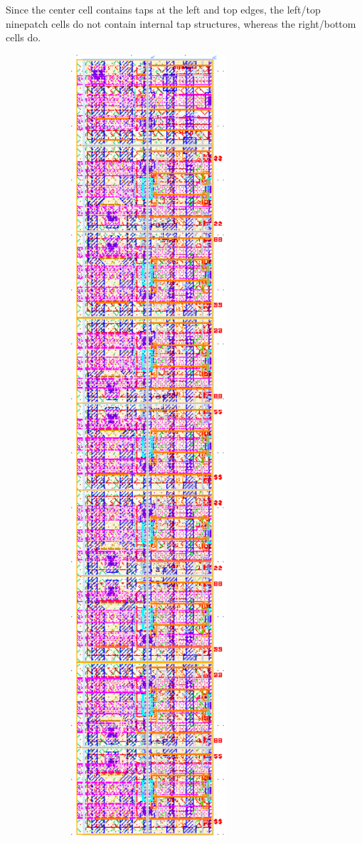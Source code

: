 Since the center cell contains taps at the left and top edges, the left/top ninepatch cells
do not contain internal tap structures, whereas the right/bottom cells do.
\begin{figure}[H] \centering
\begin{subfigure}[b]{0.22\textwidth} \centering
\includegraphics[width=0.7\textwidth]{figures/bitcell_left.png}

\end{subfigure}
\end{figure}
